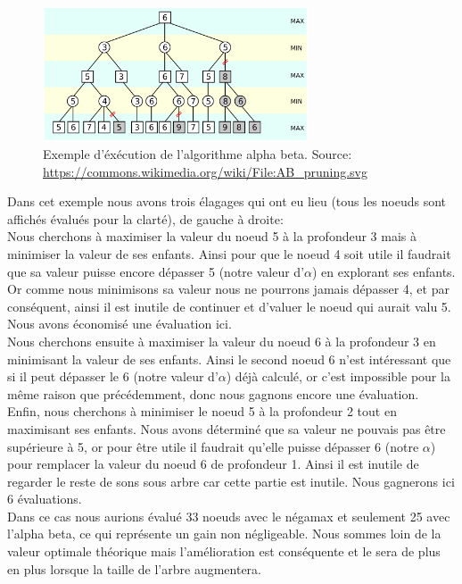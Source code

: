 \documentclass{article}
\begin{document}
\begin{figure}[!hbt]
		\centering
	\includegraphics[width=0.7\textwidth]{ab.png}
		\caption{Exemple d'éxécution de l'algorithme alpha beta. Source: \url{https://commons.wikimedia.org/wiki/File:AB\_pruning.svg}}
\end{figure}

Dans cet exemple nous avons trois élagages qui ont eu lieu (tous les noeuds sont affichés évalués pour la clarté), de gauche à droite:\\
Nous cherchons à maximiser la valeur du noeud 5 à la profondeur 3 mais à minimiser la valeur de ses enfants.
Ainsi pour que le noeud 4 soit utile il faudrait que sa valeur puisse encore dépasser 5 (notre valeur d'$\alpha$) en explorant ses enfants. Or comme nous minimisons
sa valeur nous ne pourrons jamais dépasser 4, et par conséquent, ainsi il est inutile de continuer et d'valuer le noeud qui aurait valu 5.
Nous avons économisé une évaluation ici.\\
Nous cherchons ensuite à maximiser la valeur du noeud 6 à la profondeur 3 en minimisant la valeur de ses enfants.
Ainsi le second noeud 6 n'est intéressant que si il peut dépasser le 6 (notre valeur d'$\alpha$) déjà calculé, or c'est impossible pour la même raison
que précédemment, donc nous gagnons encore une évaluation.\\
Enfin, nous cherchons à minimiser le noeud 5 à la profondeur 2 tout en maximisant ses enfants.
Nous avons déterminé que sa valeur ne pouvais pas être supérieure à 5, or pour être utile il faudrait qu'elle puisse dépasser 6 (notre $\alpha$) pour 
remplacer la valeur du noeud 6 de profondeur 1. Ainsi il est inutile de regarder le reste de sons sous arbre car cette partie est inutile.
Nous gagnerons ici 6 évaluations.\\
Dans ce cas nous aurions évalué 33 noeuds avec le négamax et seulement 25 avec l'alpha beta, ce qui représente un gain non négligeable. Nous sommes loin 
de la valeur optimale théorique mais l'amélioration est conséquente et le sera de plus en plus lorsque la taille de l'arbre augmentera. \\
\end{document}
